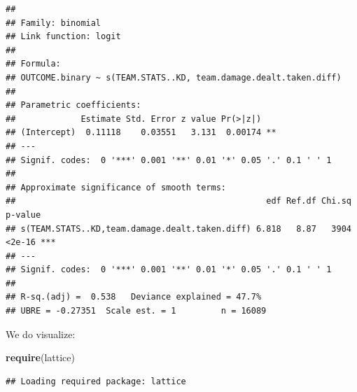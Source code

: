 \documentclass[
]{article}
\newenvironment{Shaded}{\begin{snugshade}}{\end{snugshade}}
\newcommand{\FunctionTok}[1]{\textcolor[rgb]{0.13,0.29,0.53}{\textbf{#1}}}
\newcommand{\NormalTok}[1]{#1}
\begin{document}
\begin{verbatim}
## 
## Family: binomial 
## Link function: logit 
## 
## Formula:
## OUTCOME.binary ~ s(TEAM.STATS..KD, team.damage.dealt.taken.diff)
## 
## Parametric coefficients:
##             Estimate Std. Error z value Pr(>|z|)   
## (Intercept)  0.11118    0.03551   3.131  0.00174 **
## ---
## Signif. codes:  0 '***' 0.001 '**' 0.01 '*' 0.05 '.' 0.1 ' ' 1
## 
## Approximate significance of smooth terms:
##                                                  edf Ref.df Chi.sq p-value    
## s(TEAM.STATS..KD,team.damage.dealt.taken.diff) 6.818   8.87   3904  <2e-16 ***
## ---
## Signif. codes:  0 '***' 0.001 '**' 0.01 '*' 0.05 '.' 0.1 ' ' 1
## 
## R-sq.(adj) =  0.538   Deviance explained = 47.7%
## UBRE = -0.27351  Scale est. = 1         n = 16089
\end{verbatim}

We do visualize:

\begin{Shaded}
\begin{Highlighting}[]
\FunctionTok{require}\NormalTok{(lattice)}
\end{Highlighting}
\end{Shaded}

\begin{verbatim}
## Loading required package: lattice
\end{verbatim}
\end{document}
